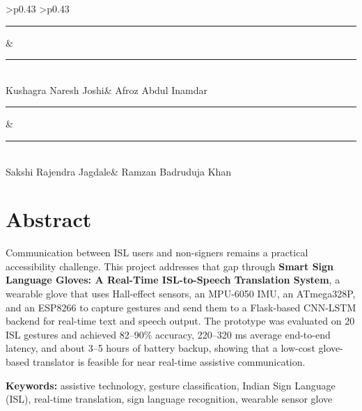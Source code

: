 \documentclass[12pt,a4paper]{report}
\newcommand{\ProjectTitle}{Smart Sign Language Gloves: A Real-Time ISL-to-Speech Translation System}
\newcommand{\StudentOne}{Kushagra Naresh Joshi}
\newcommand{\StudentTwo}{Afroz Abdul Inamdar}
\newcommand{\StudentThree}{Sakshi Rajendra Jagdale}
\newcommand{\StudentFour}{Ramzan Badruduja Khan}
\newcommand{\studentsignaturegrid}{%
  \begingroup
  \begin{center}
    \renewcommand{\arraystretch}{1.35}
    \begin{tabular}{>{\centering\arraybackslash}p{0.43\textwidth} >{\centering\arraybackslash}p{0.43\textwidth}}
      \rule{0.72\linewidth}{0.4pt} & \rule{0.72\linewidth}{0.4pt} \\
      \StudentOne & \StudentTwo \\[1.1cm]
      \rule{0.72\linewidth}{0.4pt} & \rule{0.72\linewidth}{0.4pt} \\
      \StudentThree & \StudentFour \\
    \end{tabular}
  \end{center}
  \endgroup
}
\begin{document}
\vspace{1.0cm}
\studentsignaturegrid


\newpage
\chapter*{Abstract}

\noindent Communication between ISL users and non-signers remains a practical accessibility challenge. This project addresses that gap through \textbf{\ProjectTitle}, a wearable glove that uses Hall-effect sensors, an MPU-6050 IMU, an ATmega328P, and an ESP8266 to capture gestures and send them to a Flask-based CNN-LSTM backend for real-time text and speech output. The prototype was evaluated on 20 ISL gestures and achieved 82--90\% accuracy, 220--320 ms average end-to-end latency, and about 3--5 hours of battery backup, showing that a low-cost glove-based translator is feasible for near real-time assistive communication.

\vspace{0.5cm}
\noindent \textbf{Keywords:} assistive technology, gesture classification, Indian Sign Language (ISL), real-time translation, sign language recognition, wearable sensor glove


\newpage
{}
\tableofcontents


\newpage
{}
\listoffigures


\newpage
{}
\listoftables
\end{document}

